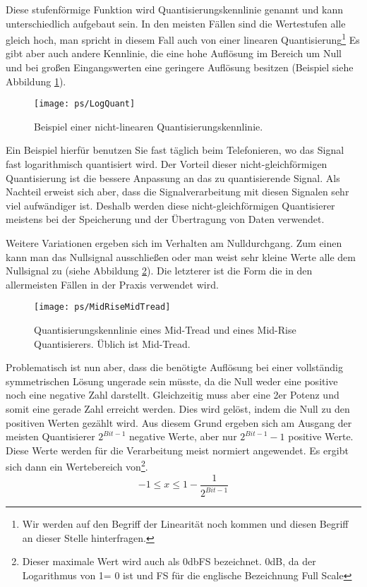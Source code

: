 Diese stufenförmige Funktion wird Quantisierungskennlinie genannt und kann unterschiedlich
aufgebaut sein. In den meisten Fällen sind die Wertestufen alle gleich hoch, man spricht in diesem
Fall auch von einer linearen Quantisierung\footnote{Wir werden auf den Begriff der Linearität noch
kommen und diesen Begriff an dieser Stelle hinterfragen.} Es gibt aber auch andere
Kennlinie, die eine hohe Auflösung im Bereich um Null und bei großen Eingangswerten
eine geringere Auflösung besitzen (Beispiel siehe Abbildung \ref{pic:NonLinearQuant}).
\begin{figure}[H]
\begin{center}
\texttt{[image: ps/LogQuant]}
\caption{\label{pic:NonLinearQuant} Beispiel einer nicht-linearen
Quantisierungskennlinie.}
\end{center}
\end{figure}

Ein Beispiel hierfür benutzen Sie fast täglich
beim Telefonieren, wo das Signal fast logarithmisch quantisiert wird. Der Vorteil
dieser nicht-gleichförmigen Quantisierung ist die bessere Anpassung an das zu quantisierende
Signal. Als Nachteil erweist sich aber, dass die Signalverarbeitung mit diesen Signalen
sehr viel aufwändiger ist. Deshalb werden diese nicht-gleichförmigen Quantisierer meistens
bei der Speicherung und der Übertragung von Daten verwendet.


Weitere Variationen ergeben sich im Verhalten am Nulldurchgang.
Zum einen kann man das Nullsignal ausschließen oder man weist sehr
kleine Werte alle dem Nullsignal zu (siehe Abbildung
\ref{pic:MidTreadMidRise}). Die letzterer ist die Form die in den
allermeisten Fällen in der Praxis verwendet wird.

\begin{figure}[H]
\begin{center}
\texttt{[image: ps/MidRiseMidTread]}
\caption{\label{pic:MidTreadMidRise} Quantisierungskennlinie eines
Mid-Tread und eines Mid-Rise Quantisierers. Üblich ist Mid-Tread.}
\end{center}
\end{figure}


Problematisch ist nun aber, dass die benötigte Auflösung bei einer vollständig symmetrischen
Lösung ungerade sein müsste, da die Null weder eine positive noch eine negative Zahl darstellt.
Gleichzeitig muss aber eine 2er Potenz und somit eine gerade Zahl erreicht werden.
Dies wird gelöst, indem die Null zu den positiven Werten gezählt wird. Aus diesem Grund
ergeben sich am Ausgang der meisten Quantisierer
$2^{Bit-1}$ negative Werte, aber nur $2^{Bit-1}-1$ positive Werte. Diese Werte werden
für die Verarbeitung meist normiert angewendet.
Es ergibt sich dann ein Wertebereich von\footnote{Dieser maximale Wert wird auch als 0dbFS bezeichnet. 0dB,
da der Logarithmus von 1= 0 ist und FS für die englische Bezeichnung Full Scale}.
\[
    -1 \leq x \leq 1-\frac{1}{2^{Bit-1}}
\]

